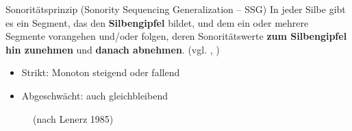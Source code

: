 \begin{frame}


\begin{block}{Sonoritätsprinzip (Sonority Sequencing Generalization -- SSG)}
In jeder Silbe gibt es ein Segment, das den \textbf{Silbengipfel} bildet, und dem ein oder mehrere Segmente vorangehen und/oder folgen, deren Sonoritätswerte \textbf{zum Silbengipfel hin zunehmen} und \textbf{danach abnehmen}. (vgl. \citealt[225]{Hall00a}, \citealt[94]{Ramers08a})
\end{block}

\begin{itemize}
	\item Strikt: Monoton steigend oder fallend
	\item Abgeschwächt: auch gleichbleibend \citep[vgl.][]{Hall00a}

\end{itemize}


\begin{figure}
	\centering
\caption{\citet[93]{Ramers08a} (nach Lenerz 1985)}
\end{figure}


\end{frame}


